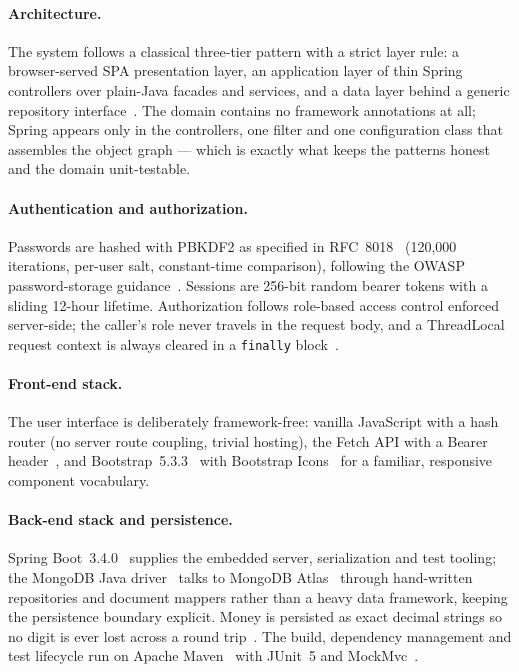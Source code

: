 \documentclass[12pt,a4paper]{report}
\begin{document}
\paragraph{Architecture.} The system follows a classical three-tier pattern with a strict
layer rule: a browser-served SPA presentation layer, an application layer of thin Spring
controllers over plain-Java facades and services, and a data layer behind a generic
repository interface~\cite{cleanarch,sommerville}. The domain contains no framework
annotations at all; Spring appears only in the controllers, one filter and one
configuration class that assembles the object graph --- which is exactly what keeps the
patterns honest and the domain unit-testable.

\paragraph{Authentication and authorization.} Passwords are hashed with PBKDF2 as
specified in RFC~8018~\cite{rfc8018} (120{,}000 iterations, per-user salt, constant-time
comparison), following the OWASP password-storage guidance~\cite{owasp}. Sessions are
256-bit random bearer tokens with a sliding 12-hour lifetime. Authorization follows
role-based access control enforced server-side; the caller's role never travels in the
request body, and a ThreadLocal request context is always cleared in a \texttt{finally}
block~\cite{owasp,fielding}.

\paragraph{Front-end stack.} The user interface is deliberately framework-free: vanilla
JavaScript with a hash router (no server route coupling, trivial hosting), the Fetch API
with a Bearer header~\cite{mdnjs,mdnfetch}, and Bootstrap~5.3.3~\cite{bootstrap} with
Bootstrap Icons~\cite{bootstrapicons} for a familiar, responsive component vocabulary.

\paragraph{Back-end stack and persistence.} Spring Boot~3.4.0~\cite{springboot} supplies
the embedded server, serialization and test tooling; the MongoDB Java
driver~\cite{mongodriver} talks to MongoDB Atlas~\cite{mongodb,atlas} through hand-written
repositories and document mappers rather than a heavy data framework, keeping the
persistence boundary explicit. Money is persisted as exact decimal strings so no digit is
ever lost across a round trip~\cite{effectivejava}. The build, dependency management and
test lifecycle run on Apache Maven~\cite{maven} with JUnit~5 and MockMvc~\cite{junit5,
springtest}.
\end{document}
